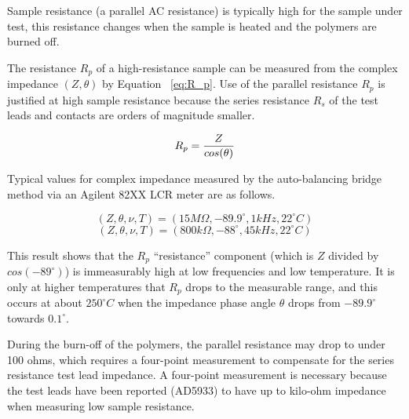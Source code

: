 \documentclass[12pt,oneside,english]{article}
\begin{document}
	Sample resistance (a parallel AC resistance) is typically high for the sample under test, this resistance changes when the sample is heated and the polymers are burned off.  

	The resistance $R_p$ of a high-resistance sample can be measured from the complex impedance $(Z,\theta)$ by Equation ~\ref{eq:R_p}.  Use of the parallel resistance $R_p$ is justified at high sample resistance because the series resistance $R_s$ of the test leads and contacts are orders of magnitude smaller.
	
	\begin{equation}
		R_p = {{Z} \over {cos({\theta})}}
		\label{eq:R_p}
	\end{equation}
	
	Typical values for complex impedance measured by the auto-balancing bridge method via an Agilent 82XX LCR meter are as follows.
	
	\begin{equation}
		\left( Z,\theta,\nu,T \right) = \left( 15 M\Omega, -89.9^\circ, 1kHz, 22^{\circ}C \right)
	\end{equation}
	\begin{equation}
		\left( Z, \theta, \nu, T \right) = \left( 800 k\Omega, -88^\circ, 45kHz, 22^{\circ}C \right)
	\end{equation}
	
	This result shows that the $R_p$ ``resistance'' component (which is $Z$ divided by $cos(-89^\circ)$) is immeasurably high at low frequencies and low temperature.  It is only at higher temperatures that $R_p$ drops to the measurable range, and this occurs at about $250^{\circ}C$ when the impedance phase angle $\theta$ drops from $-89.9^\circ$ towards $0.1^\circ$.
	
	During the burn-off of the polymers, the parallel resistance may drop to under 100 ohms, which requires a four-point measurement to compensate for the series resistance test lead impedance.
	A four-point measurement is necessary because the test leads have been reported (AD5933) to have up to kilo-ohm impedance when measuring low sample resistance.


\clearpage


\end{document}
